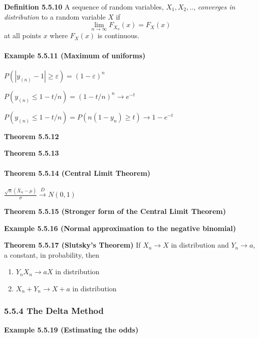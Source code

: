 \documentclass[6pt,Portrait]{article}
\let\oldparagraph\paragraph
\renewcommand{\paragraph}[1]{\oldparagraph{#1}\mbox{}}
\begin{document}
\textbf{Definition 5.5.10} A sequence of random variables,
\(X_1,X_2,..\), \emph{converges in distribution} to a random variable
\(X\) if \[\lim_{n\to\infty}F_{X_n}(x)=F_X(x)\] at all points \(x\)
where \(F_X(x)\) is continuous.

\hypertarget{Max-Unif}{%
\paragraph{\texorpdfstring{\textbf{Example 5.5.11 (Maximum of
uniforms)}}{Example 5.5.11 (Maximum of uniforms)}}\label{Max-Unif}}

\(P(|y_{(n)}-1|\ge\varepsilon)=(1-\varepsilon)^n\)

\(P(y_{(n)}\le1-t/n)=(1-t/n)^n\to e^{-t}\)

\(P(y_{(n)}\le1-t/n)=P(n(1-y_n)\ge t)\to 1-e^{-t}\)

\textbf{Theorem 5.5.12}

\textbf{Theorem 5.5.13}

\hypertarget{CLT}{%
\paragraph{\texorpdfstring{\textbf{Theorem 5.5.14 (Central Limit
Theorem)}}{Theorem 5.5.14 (Central Limit Theorem)}}\label{CLT}}

\(\frac{\sqrt n(\bar X_n-\mu)}{\sigma}\overset{D}{\to}N(0,1)\)

\textbf{Theorem 5.5.15 (Stronger form of the Central Limit Theorem)}

\textbf{Example 5.5.16 (Normal approximation to the negative binomial)}

\textbf{Theorem 5.5.17 (Slutsky's Theorem)} If \(X_n\to X\) in
distribution and \(Y_n\to a\), a constant, in probability, then

\begin{enumerate}
\def\labelenumi{\alph{enumi}.}
\item
  \(Y_nX_n\to aX\) in distribution
\item
  \(X_n+Y_n\to X+a\) in distribution
\end{enumerate}

\hypertarget{the-delta-method}{%
\subsubsection{5.5.4 The Delta Method}\label{the-delta-method}}

\textbf{Example 5.5.19 (Estimating the odds)}
\end{document}
